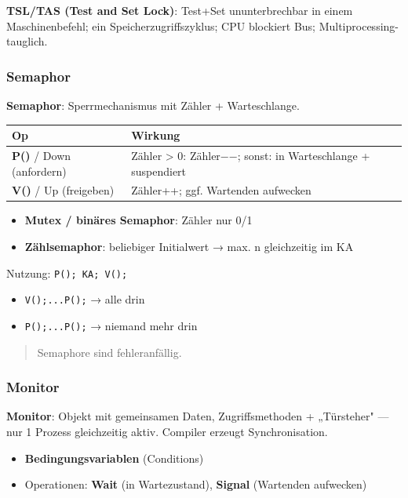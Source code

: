 \documentclass[11pt, a4paper]{article}
\begin{document}
\textbf{TSL/TAS (Test and Set Lock)}: Test+Set ununterbrechbar in einem Maschinenbefehl; ein Speicherzugriffszyklus; CPU blockiert Bus; Multiprocessing-tauglich.



\subsubsection{Semaphor}

\textbf{Semaphor}: Sperrmechanismus mit Zähler + Warteschlange.



{\small
\begin{tabularx}{\linewidth}{XX}
\hline
\rowcolor{tableheadbg}
{\color{white}\textbf{Op}} & {\color{white}\textbf{Wirkung}} \\[2pt]
\hline
\endhead
\hline
\endfoot
\textbf{P()} / Down (anfordern) & Zähler > 0: Zähler−−; sonst: in Warteschlange + suspendiert \\
\textbf{V()} / Up (freigeben) & Zähler++; ggf. Wartenden aufwecken \\
\end{tabularx}
}


\begin{itemize}
  \item \textbf{Mutex / binäres Semaphor}: Zähler nur 0/1
  \item \textbf{Zählsemaphor}: beliebiger Initialwert → max. n gleichzeitig im KA
\end{itemize}

Nutzung: \texttt{P(); KA; V();}

\begin{itemize}
  \item \texttt{V();...P();} → alle drin
  \item \texttt{P();...P();} → niemand mehr drin
\end{itemize}

\begin{quote}
Semaphore sind fehleranfällig.
\end{quote}


\subsubsection{Monitor}

\textbf{Monitor}: Objekt mit gemeinsamen Daten, Zugriffsmethoden + „Türsteher" — nur 1 Prozess gleichzeitig aktiv. Compiler erzeugt Synchronisation.


\begin{itemize}
  \item \textbf{Bedingungsvariablen} (Conditions)
  \item Operationen: \textbf{Wait} (in Wartezustand), \textbf{Signal} (Wartenden aufwecken)
\end{itemize}
\end{document}
